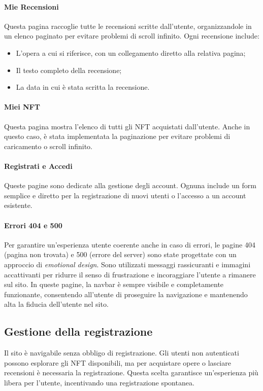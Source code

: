 \documentclass[10pt]{article}
\begin{document}
\paragraph{Mie Recensioni}
Questa pagina raccoglie tutte le recensioni scritte dall’utente, organizzandole in un elenco paginato per evitare problemi di scroll infinito. Ogni recensione include:
\begin{itemize} \item L’opera a cui si riferisce, con un collegamento diretto alla relativa pagina; \item Il testo completo della recensione; \item La data in cui è stata scritta la recensione.
\end{itemize} 

\paragraph{Miei NFT}
Questa pagina mostra l’elenco di tutti gli NFT acquistati dall’utente. Anche in questo caso, è stata implementata la paginazione per evitare problemi di caricamento o scroll infinito.

\paragraph{Registrati e Accedi} Queste pagine sono dedicate alla gestione degli account. Ognuna include un form semplice e diretto per la registrazione di nuovi utenti o l’accesso a un account esistente.

\paragraph{Errori 404 e 500} Per garantire un’esperienza utente coerente anche in caso di errori, le pagine 404 (pagina non trovata) e 500 (errore del server) sono state progettate con un approccio di \textit{emotional design}. Sono utilizzati messaggi rassicuranti e immagini accattivanti per ridurre il senso di frustrazione e incoraggiare l’utente a rimanere sul sito. In queste pagine, la navbar è sempre visibile e completamente funzionante, consentendo all’utente di proseguire la navigazione e mantenendo alta la fiducia dell’utente nel sito.

\subsection{Gestione della registrazione}
Il sito è navigabile senza obbligo di registrazione. Gli utenti non autenticati possono esplorare gli NFT disponibili, ma per acquistare opere o lasciare recensioni è necessaria la registrazione. Questa scelta garantisce un’esperienza più libera per l'utente, incentivando una registrazione spontanea.
\end{document}
